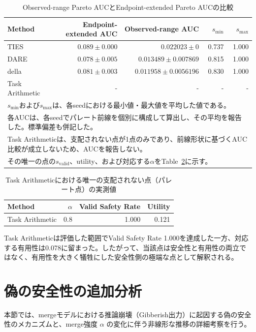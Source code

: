 \documentclass{article}
\begin{document}
\begin{table}[H]
\centering
\caption{Observed-range Pareto AUCとEndpoint-extended Pareto AUCの比較}
\label{tab:auc_no_interpolation}
\small
\begin{tabular}{lrrrr}
\toprule
Method & Endpoint-extended AUC & Observed-range AUC & \(s_{\min}\) & \(s_{\max}\) \\
\midrule
TIES & $0.089 \pm 0.000$ & $0.022023 \pm 0$ & 0.737 & 1.000 \\
DARE & $0.078 \pm 0.005$ & $0.013489 \pm 0.007869$ & 0.815 & 1.000 \\
della & $0.081 \pm 0.003$ & $0.011958 \pm 0.0056196$ & 0.830 & 1.000 \\
Task Arithmetic & - & - & - & - \\
\bottomrule
\multicolumn{5}{l}{\footnotesize \(s_{\min}\)および\(s_{\max}\)は、各seedにおける最小値・最大値を平均した値である。} \\
\multicolumn{5}{l}{\footnotesize 各AUCは、各seedでパレート前線を個別に構成して算出し、その平均を報告した。標準偏差も併記した。} \\
\multicolumn{5}{l}{\footnotesize Task Arithmeticは、支配されない点が1点のみであり、前線形状に基づくAUC比較が成立しないため、AUCを報告しない。} \\
\multicolumn{5}{l}{\footnotesize その唯一の点の\(s_{\mathrm{valid}}\)、utility、および対応する\(\alpha\)をTable~\ref{tab:task-arithmetic-single-point}に示す。} \\
\end{tabular}
\end{table}

\begin{table}[H]
\centering
\caption{Task Arithmeticにおける唯一の支配されない点（パレート点）の実測値}
\label{tab:task-arithmetic-single-point}
\small
\begin{tabular}{lrrr}
\toprule
Method & \(\alpha\) & Valid Safety Rate & Utility \\
\midrule
Task Arithmetic & 0.8 & 1.000 & 0.121 \\
\bottomrule
\end{tabular}
\end{table}

Task Arithmeticは評価した範囲でValid Safety Rate 1.000を達成した一方、対応する有用性は0.078に留まった。したがって、当該点は安全性と有用性の両立ではなく、有用性を大きく犠牲にした安全性側の極端な点として解釈される。

\section{偽の安全性の追加分析}
\label{app:偽の安全性の追加分析}
本節では、mergeモデルにおける推論崩壊（Gibberish出力）に起因する偽の安全性のメカニズムと、merge強度 $\alpha$ の変化に伴う非線形な推移の詳細考察を行う。
\end{document}
